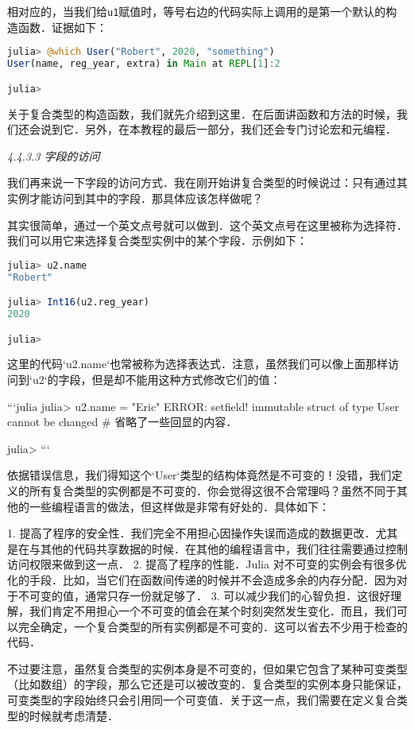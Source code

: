 相对应的，当我们给\verb|u1|赋值时，等号右边的代码实际上调用的是第一个默认的构造函数．证据如下：

\begin{lstlisting}[language=julia]
julia> @which User("Robert", 2020, "something")
User(name, reg_year, extra) in Main at REPL[1]:2

julia> 
\end{lstlisting}

关于复合类型的构造函数，我们就先介绍到这里．在后面讲函数和方法的时候，我们还会说到它．另外，在本教程的最后一部分，我们还会专门讨论宏和元编程．

\textsl{4.4.3.3 字段的访问}

我们再来说一下字段的访问方式．我在刚开始讲复合类型的时候说过：只有通过其实例才能访问到其中的字段．那具体应该怎样做呢？

其实很简单，通过一个英文点号就可以做到．这个英文点号在这里被称为选择符．我们可以用它来选择复合类型实例中的某个字段．示例如下：

\begin{lstlisting}[language=julia]
julia> u2.name
"Robert"

julia> Int16(u2.reg_year)
2020

julia> 
\end{lstlisting}

这里的代码`u2.name`也常被称为选择表达式．注意，虽然我们可以像上面那样访问到`u2`的字段，但是却不能用这种方式修改它们的值：

```julia
julia> u2.name = "Eric"
ERROR: setfield! immutable struct of type User cannot be changed
# 省略了一些回显的内容．

julia> 
```

依据错误信息，我们得知这个`User`类型的结构体竟然是不可变的！没错，我们定义的所有复合类型的实例都是不可变的．你会觉得这很不合常理吗？虽然不同于其他的一些编程语言的做法，但这样做是非常有好处的．具体如下：

1. 提高了程序的安全性．我们完全不用担心因操作失误而造成的数据更改．尤其是在与其他的代码共享数据的时候．在其他的编程语言中，我们往往需要通过控制访问权限来做到这一点．
2. 提高了程序的性能．Julia 对不可变的实例会有很多优化的手段．比如，当它们在函数间传递的时候并不会造成多余的内存分配．因为对于不可变的值，通常只存一份就足够了．
3. 可以减少我们的心智负担．这很好理解，我们肯定不用担心一个不可变的值会在某个时刻突然发生变化．而且，我们可以完全确定，一个复合类型的所有实例都是不可变的．这可以省去不少用于检查的代码．

不过要注意，虽然复合类型的实例本身是不可变的，但如果它包含了某种可变类型（比如数组）的字段，那么它还是可以被改变的．复合类型的实例本身只能保证，可变类型的字段始终只会引用同一个可变值．关于这一点，我们需要在定义复合类型的时候就考虑清楚．

